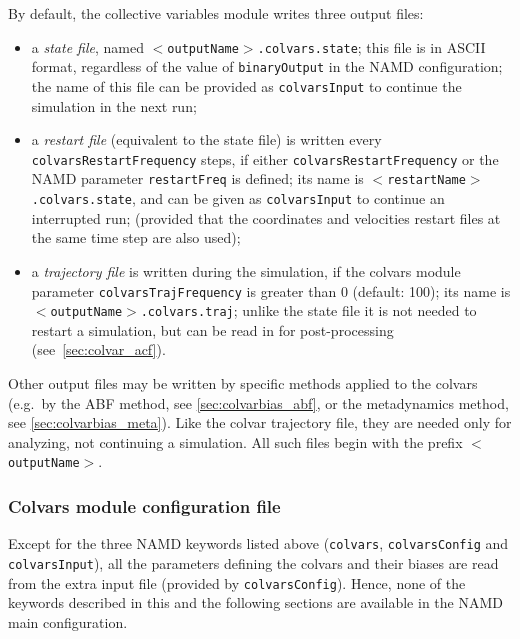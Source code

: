 By default, the collective variables module writes three output
files:
\begin{itemize}

\item a \emph{state file}, named
  \texttt{$<$outputName$>$.colvars.state}; this file is in ASCII
  format, regardless of the value of \texttt{binaryOutput} in the NAMD
  configuration; the name of this file can be provided as
  \texttt{colvarsInput} to continue the simulation in the next run;

\item a \emph{restart file} (equivalent to the state file) is written
  every \texttt{colvarsRestartFrequency} steps, if either
  \texttt{colvarsRestartFrequency} or the NAMD parameter
  \texttt{restartFreq} is defined; its name is
  \texttt{$<$restartName$>$.colvars.state}, and can be given as
  \texttt{colvarsInput} to continue an interrupted run; (provided that
  the coordinates and velocities restart files at the same time step
  are also used);

\item a \emph{trajectory file} is written during the simulation, if
  the colvars module parameter \texttt{colvarsTrajFrequency} is
  greater than 0 (default: 100); its name is
  \texttt{$<$outputName$>$.colvars.traj}; unlike the state file it is
  not needed to restart a simulation, but can be read in for
  post-processing (see~\ref{sec:colvar_acf}).

\end{itemize}

Other output files may be written by specific methods applied to the
colvars (e.g.~by the ABF method, see \ref{sec:colvarbias_abf}, or the
metadynamics method, see \ref{sec:colvarbias_meta}).  Like the colvar
trajectory file, they are needed only for analyzing, not continuing a
simulation.  All such files begin with the prefix
\texttt{$<$outputName$>$}.


\subsubsection{Colvars module configuration file}

Except for the three NAMD keywords listed above (\texttt{colvars},
\texttt{colvarsConfig} and \texttt{colvarsInput}), all the parameters
defining the colvars and their biases are read from the extra input
file (provided by \texttt{colvarsConfig}).  Hence, none of the
keywords described in this and the following sections are available in
the NAMD main configuration.

